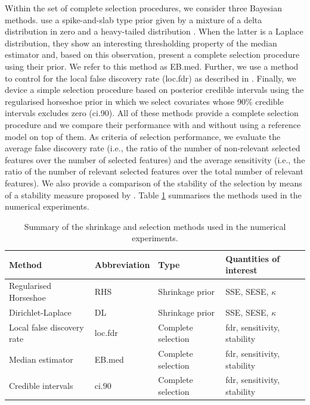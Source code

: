 \documentclass[american,]{article}
\theoremstyle{definition}
\begin{document}
Within the set of complete selection procedures, we consider three
Bayesian methods.  \cite{johnstone2004needles} use a spike-and-slab
type prior given by a mixture of a delta distribution in zero and a
heavy-tailed distribution \cite[see
also][]{paper:spike_slab_mitchell}. When the latter is a Laplace
distribution, they show an interesting thresholding property of the
median estimator and, based on this observation, present a complete
selection procedure using their prior. We refer to this method as
EB.med. Further, we use a method to control for the local false
discovery rate (loc.fdr) as described in \cite{paper:efron,
  efron2012large}. Finally, we device a simple selection procedure
based on posterior credible intervals using the regularised horseshoe
prior in which we select covariates whose 90\% credible intervals
excludes zero (ci.90). All of these methods provide a complete
selection procedure and we compare their performance with and without
using a reference model on top of them. As criteria of selection
performance, we evaluate the average false discovery rate (i.e., the
ratio of the number of non-relevant selected features over the number
of selected features) and the average sensitivity (i.e., the ratio of
the number of relevant selected features over the total number of
relevant features). We also provide a comparison of the stability of
the selection by means of a stability measure proposed by
\cite{paper:stability}. Table \ref{tab:comparison} summarises the
methods used in the numerical experiments.

\begin{table}[tp]
\scriptsize
\centering
\begin{tabular}{l|l|l|l}
 Method & Abbreviation & Type & Quantities of interest \\ 
  \hline
 Regularised Horseshoe & RHS & Shrinkage prior & SSE, SESE, $\kappa$ \\
 Dirichlet-Laplace & DL & Shrinkage prior & SSE, SESE, $\kappa$ \\
 Local false discovery rate & loc.fdr & Complete selection & fdr, sensitivity, stability \\
 Median estimator & EB.med & Complete selection & fdr, sensitivity, stability \\
 Credible intervals & ci.90 & Complete selection & fdr, sensitivity, stability \\
\end{tabular}
\caption{Summary of the shrinkage and selection methods used in the numerical experiments.}
\label{tab:comparison}
\end{table}
\end{document}

